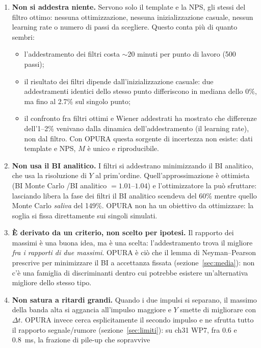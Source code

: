 \documentclass[11pt,a4paper]{article}
\newcommand{\dt}{\Delta t}
\begin{document}
\begin{enumerate}
  \item \textbf{Non si addestra niente.} Servono solo il template e la NPS, gli stessi del filtro
    ottimo: nessuna ottimizzazione, nessuna inizializzazione casuale, nessun learning rate o numero
    di passi da scegliere. Questo conta più di quanto sembri:
    \begin{itemize}
      \item l'addestramento dei filtri costa $\sim$20 minuti per punto di lavoro (500 passi);
      \item il risultato dei filtri dipende dall'inizializzazione casuale: due addestramenti
        identici dello stesso punto differiscono in mediana dello 0\%, ma fino al 2.7\% sul singolo
        punto;
      \item il confronto fra filtri ottimi e Wiener addestrati ha mostrato che differenze dell'1--2\%
        venivano dalla dinamica dell'addestramento (il learning rate), non dal filtro. Con OPURA
        questa sorgente di incertezza non esiste: dati template e NPS, $M$ è unico e riproducibile.
    \end{itemize}
  \item \textbf{Non usa il BI analitico.} I filtri si addestrano minimizzando il BI analitico, che
    usa la risoluzione di $Y$ al prim'ordine. Quell'approssimazione è ottimista (BI Monte Carlo
    /BI analitico $= 1.01$--$1.04$) e l'ottimizzatore la può sfruttare: lasciando libera la fase dei
    filtri il BI analitico scendeva del 60\% mentre quello Monte Carlo \emph{saliva} del 149\%.
    OPURA non ha un obiettivo da ottimizzare: la soglia si fissa direttamente sui singoli simulati.
  \item \textbf{È derivato da un criterio, non scelto per ipotesi.} Il rapporto dei massimi è una
    buona idea, ma è una scelta: l'addestramento trova il migliore \emph{fra i rapporti di due
    massimi}. OPURA è ciò che il lemma di Neyman--Pearson prescrive per minimizzare il BI a
    accettanza fissata (sezione~\ref{sec:media}): non c'è una famiglia di discriminanti dentro cui
    potrebbe esistere un'alternativa migliore dello stesso tipo.
  \item \textbf{Non satura a ritardi grandi.} Quando i due impulsi si separano, il massimo della
    banda alta si aggancia all'impulso maggiore e $Y$ smette di migliorare con $\dt$. OPURA invece
    cerca esplicitamente il secondo impulso e ne sfrutta tutto il rapporto segnale/rumore
    (sezione~\ref{sec:limiti}): su ch31 WP7, fra 0.6 e 0.8~ms, la frazione di pile-up che sopravvive

\end{enumerate}
\end{document}
